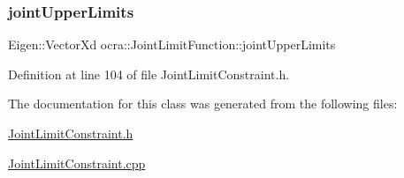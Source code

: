 \subsubsection{\texorpdfstring{joint\+Upper\+Limits}{jointUpperLimits}}
{\footnotesize\ttfamily Eigen\+::\+Vector\+Xd ocra\+::\+Joint\+Limit\+Function\+::joint\+Upper\+Limits\hspace{0.3cm}{\ttfamily [protected]}}



Definition at line 104 of file Joint\+Limit\+Constraint.\+h.



The documentation for this class was generated from the following files\+:\begin{DoxyCompactItemize}
\item 
\hyperlink{JointLimitConstraint_8h}{Joint\+Limit\+Constraint.\+h}\item 
\hyperlink{JointLimitConstraint_8cpp}{Joint\+Limit\+Constraint.\+cpp}\end{DoxyCompactItemize}
